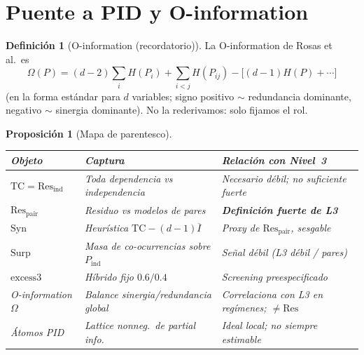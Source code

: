 \documentclass[11pt,a4paper]{article}
\theoremstyle{definition}
\newtheorem{definition}{Definici\'on}[section]
\theoremstyle{plain}
\newtheorem{proposition}{Proposici\'on}[section]
\theoremstyle{remark}
\newcommand{\Res}{\mathrm{Res}}
\newcommand{\TC}{\mathrm{TC}}
\newcommand{\Syn}{\mathrm{Syn}}
\newcommand{\Surp}{\mathrm{Surp}}
\newcommand{\excess}{\mathrm{excess3}}
\begin{document}
\section{Puente a PID y O-information}
\label{sec:PID}

\begin{definition}[O-information (recordatorio)]
\label{def:Oinfo}
La O-information de Rosas et al.\ es
\begin{equation}
\Omega(P)
=(d-2)\sum_i H(P_i)
+\sum_{i<j}H(P_{ij})
-\bigl[(d-1)H(P)+\cdots\bigr]
\end{equation}
(en la forma est\'andar para $d$ variables; signo positivo $\sim$
redundancia dominante, negativo $\sim$ sinergia dominante). No la
rederivamos: solo fijamos el rol.
\end{definition}

\begin{proposition}[Mapa de parentesco]
\label{prop:map}
\begin{center}
\begin{tabular}{@{}p{}p{}p{}@{}}
\toprule
Objeto & Captura & Relaci\'on con Nivel~3 \\
\midrule
$\TC=\Res_{\mathrm{ind}}$ & Toda dependencia vs independencia &
Necesario d\'ebil; no suficiente fuerte \\
$\Res_{\mathrm{pair}}$ & Residuo vs modelos de pares &
\textbf{Definici\'on fuerte de L3} \\
$\Syn$ & Heur\'istica $\TC-(d-1)\overline{I}$ &
Proxy de $\Res_{\mathrm{pair}}$, sesgable \\
$\Surp$ & Masa de co-ocurrencias sobre $P_{\mathrm{ind}}$ &
Se\~nal d\'ebil (L3 d\'ebil / pares) \\
$\excess$ & H\'ibrido fijo $0.6/0.4$ &
Screening preespecificado \\
O-information $\Omega$ & Balance sinergia/redundancia global &
Correlaciona con L3 en reg\'imenes; $\ne\Res$ \\
\'Atomos PID & Lattice nonneg.\ de partial info.\ &
Ideal local; no siempre estimable \\
\bottomrule
\end{tabular}
\end{center}
\end{proposition}
\end{document}
